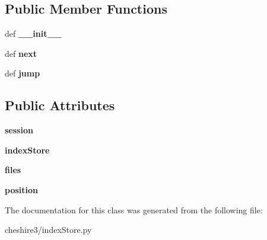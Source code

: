 \subsection*{Public Member Functions}
\begin{DoxyCompactItemize}
\item 
\hypertarget{classcheshire3_1_1index_store_1_1_index_store_iter_a961e56dc12b24193789b7dfa9848eed4}{def {\bfseries \-\_\-\-\_\-init\-\_\-\-\_\-}}\label{classcheshire3_1_1index_store_1_1_index_store_iter_a961e56dc12b24193789b7dfa9848eed4}

\item 
\hypertarget{classcheshire3_1_1index_store_1_1_index_store_iter_a93524e5b4c732aeb0d65b7d19fbf5ff4}{def {\bfseries next}}\label{classcheshire3_1_1index_store_1_1_index_store_iter_a93524e5b4c732aeb0d65b7d19fbf5ff4}

\item 
\hypertarget{classcheshire3_1_1index_store_1_1_index_store_iter_addef953ad9274055398c62695084e160}{def {\bfseries jump}}\label{classcheshire3_1_1index_store_1_1_index_store_iter_addef953ad9274055398c62695084e160}

\end{DoxyCompactItemize}
\subsection*{Public Attributes}
\begin{DoxyCompactItemize}
\item 
\hypertarget{classcheshire3_1_1index_store_1_1_index_store_iter_aaf6d8bbe0a103b8d520c5eb96bdd51f5}{{\bfseries session}}\label{classcheshire3_1_1index_store_1_1_index_store_iter_aaf6d8bbe0a103b8d520c5eb96bdd51f5}

\item 
\hypertarget{classcheshire3_1_1index_store_1_1_index_store_iter_a848386fc85a4808d173070ae9178ce02}{{\bfseries index\-Store}}\label{classcheshire3_1_1index_store_1_1_index_store_iter_a848386fc85a4808d173070ae9178ce02}

\item 
\hypertarget{classcheshire3_1_1index_store_1_1_index_store_iter_afcc1c9ab96698499d70e8f0756433d2f}{{\bfseries files}}\label{classcheshire3_1_1index_store_1_1_index_store_iter_afcc1c9ab96698499d70e8f0756433d2f}

\item 
\hypertarget{classcheshire3_1_1index_store_1_1_index_store_iter_a7acfcdebca37c14e12235e9572e85622}{{\bfseries position}}\label{classcheshire3_1_1index_store_1_1_index_store_iter_a7acfcdebca37c14e12235e9572e85622}

\end{DoxyCompactItemize}


The documentation for this class was generated from the following file\-:\begin{DoxyCompactItemize}
\item 
cheshire3/index\-Store.\-py\end{DoxyCompactItemize}
